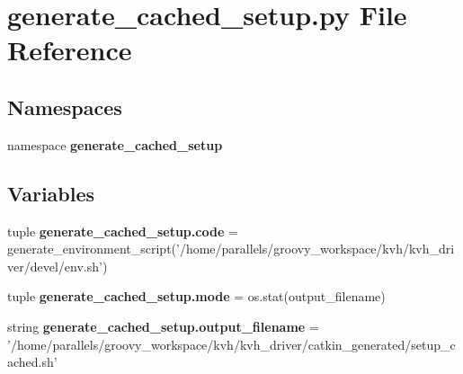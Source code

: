 \section{generate\-\_\-cached\-\_\-setup.\-py \-File \-Reference}
\label{generate__cached__setup_8py}
\subsection*{\-Namespaces}
\begin{DoxyCompactItemize}
\item 
namespace {\bf generate\-\_\-cached\-\_\-setup}
\end{DoxyCompactItemize}
\subsection*{\-Variables}
\begin{DoxyCompactItemize}
\item 
tuple {\bf generate\-\_\-cached\-\_\-setup.\-code} = generate\-\_\-environment\-\_\-script('/home/parallels/groovy\-\_\-workspace/kvh/kvh\-\_\-driver/devel/env.\-sh')
\item 
tuple {\bf generate\-\_\-cached\-\_\-setup.\-mode} = os.\-stat(output\-\_\-filename)
\item 
string {\bf generate\-\_\-cached\-\_\-setup.\-output\-\_\-filename} = '/home/parallels/groovy\-\_\-workspace/kvh/kvh\-\_\-driver/catkin\-\_\-generated/setup\-\_\-cached.\-sh'
\end{DoxyCompactItemize}
